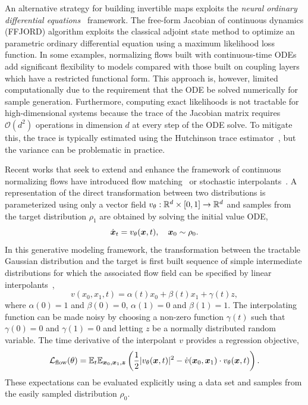 \documentclass[11pt]{article}
\begin{document}
An alternative strategy for building invertible maps exploits the \emph{neural ordinary differential equations}~\cite{chen_neural_2018} framework.
The free-form Jacobian of continuous dynamics (FFJORD) algorithm exploits the classical adjoint state method to optimize an parametric ordinary differential equation using a maximum likelihood loss function. 
In some examples, normalizing flows built with continuous-time ODEs add significant flexibility to models compared with those built on coupling layers which have a restricted functional form.
This approach is, however, limited computationally due to the requirement that the ODE be solved numerically for sample generation. 
Furthermore, computing exact likelihoods is not tractable for high-dimensional systems because the trace of the Jacobian matrix requires $\mathcal{O}(d^2)$ operations in dimension $d$ at every step of the ODE solve.
To mitigate this, the trace is typically estimated using the Hutchinson trace estimator~\cite{hutchinson_stochastic_1989}, but the variance can be problematic in practice. 

Recent works that seek to extend and enhance the framework of continuous normalizing flows have introduced flow matching~\cite{peluchetti_non-denoising_2022,peluchetti_diffusion_2023,lipman_flow_2022} or stochastic interpolants~\cite{albergo_building_2022, albergo_stochastic_2023}.
A representation of the direct transformation between two distributions is parameterized using only a vector field $v_{\theta}: \mathbb{R}^d\times[0,1]\to \mathbb{R}^d$ and samples from the target distribution $\rho_1$ are obtained by solving the initial value ODE,
\begin{equation}
    \dot {\boldsymbol{x}}_t = v_{\theta}(\boldsymbol{x},t), \quad \boldsymbol{x}_0 \sim \rho_0.
\end{equation}
In this generative modeling framework, the transformation between the tractable Gaussian distribution and the target is first built sequence of simple intermediate distributions for which the associated flow field can be specified by linear interpolants~\cite{lipman_flow_2022, albergo_building_2022}, 
\begin{equation}
    v(x_0, x_1, t) = \alpha(t) x_0 + \beta(t) x_1 + \gamma(t) z,
\end{equation}
where $\alpha(0)=1$ and $\beta(0)=0$, $\alpha(1)=0$ and $\beta(1)=1$.
The interpolating function can be made noisy by choosing a non-zero function $\gamma(t)$ such that $\gamma(0)=0$ and $\gamma(1)=0$ and letting $z$ be a normally distributed random variable.
The time derivative of the interpolant $v$ provides a regression objective, 
\begin{equation}
    \mathcal{L}_{\rm flow}(\theta) = \mathbb{E}_{t} \mathbb{E}_{\boldsymbol{x}_0, \boldsymbol{x}_1, \boldsymbol{z}} \left( \frac12 |v_\theta(\boldsymbol{x}, t)|^2 - \dot v(\boldsymbol{x}_0, \boldsymbol{x}_1) \cdot v_{\theta}(\boldsymbol{x}, t) \right).
\end{equation}
These expectations can be evaluated explicitly using a data set and samples from the easily sampled distribution $\rho_0$.
\end{document}
